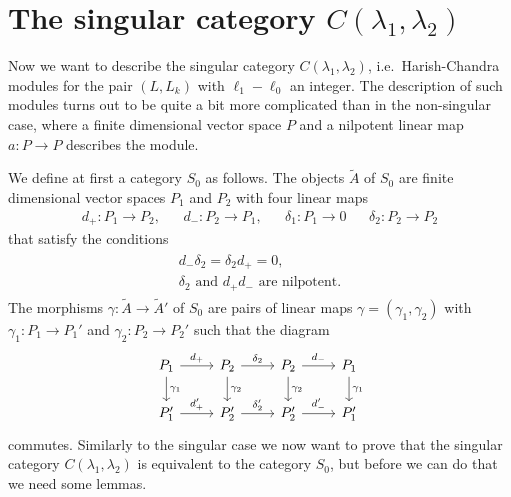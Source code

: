 \section{\texorpdfstring{The singular category $C(\lambda_1,\lambda_2)$}{The singular category C(lambda\_1,lambda\_2)}}

Now we want to describe the singular category $C(\lambda_1,\lambda_2)$, i.e.\ Harish-Chandra modules for the pair $(L,L_k)$ with $\ell_1-\ell_0$ an integer. The description of such modules turns out to be quite a bit more complicated than in the non-singular case, where a finite dimensional vector space $P$ and a nilpotent linear map $a\colon P\to P$ describes the module.

We define at first a category $S_0$ as follows. The objects $\widetilde{A}$ of $S_0$ are finite dimensional vector spaces $P_1$ and $P_2$ with four linear maps
\begin{align}
  d_+ \colon P_1\to P_2, && d_- \colon P_2\to P_1, && \delta_1\colon P_1\to 0 && \delta_2\colon P_2\to P_2
\end{align}
that satisfy the conditions
\begin{align}
  \begin{aligned}
    d_-\delta_2 = \delta_2d_+ = 0, \\
    \delta_2 \text{ and } d_+d_- \text{ are nilpotent.}
  \end{aligned}
\end{align}
The morphisms $\gamma\colon \widetilde{A}\to \widetilde{A}'$ of $S_0$ are pairs of linear maps $\gamma=(\gamma_1,\gamma_2)$ with $\gamma_1\colon P_1\to P_1'$ and $\gamma_2\colon P_2\to P_2'$ such that the diagram
\[
  \begin{tikzcd}
    P_1 \ar[d,"\gamma_1"] \ar[r,"d_+"] & P_2 \ar[d,"\gamma_2"] \ar[r,"\delta_2"] & P_2 \ar[d,"\gamma_2"] \ar[r,"d_-"] & P_1 \ar[d,"\gamma_1"] \\
    P_1' \ar[r,"d_+'"] & P_2' \ar[r,"\delta_2'"] & P_2' \ar[r,"d_-'"] & P_1'
  \end{tikzcd}
\]
commutes. Similarly to the singular case we now want to prove that the singular category $C(\lambda_1,\lambda_2)$ is equivalent to the category $S_0$, but before we can do that we need some lemmas.

